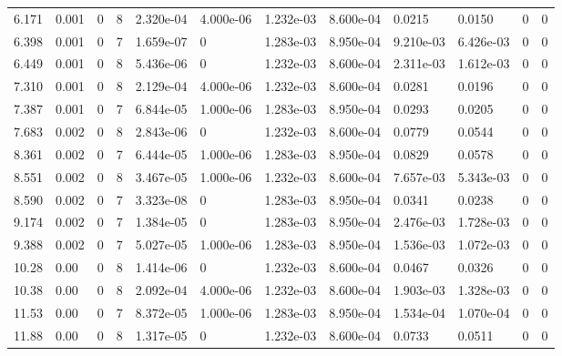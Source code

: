 \documentclass[preview]{standalone}
\begin{document}
{{\begin{tabular}{L{1.2cm}C{1.2cm} C{0.3cm}C{0.5cm} C{1.4cm}C{1.4cm} C{1.4cm}C{1.4cm} C{1.6cm}C{1.6cm} C{1.6cm}C{1.6cm}}
  6.171  &  0.001  & 0     &  8 &  2.320e-04  & 4.000e-06  &  1.232e-03&   8.600e-04& 0.0215 & 0.0150   &  0 & 0  \\ 
  6.398  &  0.001  & 0     &  7 &  1.659e-07  & 0  &  1.283e-03&   8.950e-04& 9.210e-03 & 6.426e-03   &  0 & 0  \\ 
  6.449  &  0.001  & 0     &  8 &  5.436e-06  & 0  &  1.232e-03&   8.600e-04& 2.311e-03 & 1.612e-03   &  0 & 0  \\ 
  7.310  &  0.001  & 0     &  8 &  2.129e-04  & 4.000e-06  &  1.232e-03&   8.600e-04& 0.0281 & 0.0196   &  0 & 0  \\ 
  7.387  &  0.001  & 0     &  7 &  6.844e-05  & 1.000e-06  &  1.283e-03&   8.950e-04& 0.0293 & 0.0205   &  0 & 0  \\ 
  7.683  &  0.002  & 0     &  8 &  2.843e-06  & 0  &  1.232e-03&   8.600e-04& 0.0779 & 0.0544   &  0 & 0  \\ 
  8.361  &  0.002  & 0     &  7 &  6.444e-05  & 1.000e-06  &  1.283e-03&   8.950e-04& 0.0829 & 0.0578   &  0 & 0  \\ 
  8.551  &  0.002  & 0     &  8 &  3.467e-05  & 1.000e-06  &  1.232e-03&   8.600e-04& 7.657e-03 & 5.343e-03   &  0 & 0  \\ 
  8.590  &  0.002  & 0     &  7 &  3.323e-08  & 0  &  1.283e-03&   8.950e-04& 0.0341 & 0.0238   &  0 & 0  \\ 
  9.174  &  0.002  & 0     &  7 &  1.384e-05  & 0  &  1.283e-03&   8.950e-04& 2.476e-03 & 1.728e-03   &  0 & 0  \\ 
  9.388  &  0.002  & 0     &  7 &  5.027e-05  & 1.000e-06  &  1.283e-03&   8.950e-04& 1.536e-03 & 1.072e-03   &  0 & 0  \\ 
  10.28  &  0.00  & 0     &  8 &  1.414e-06  & 0  &  1.232e-03&   8.600e-04& 0.0467 & 0.0326   &  0 & 0  \\ 
  10.38  &  0.00  & 0     &  8 &  2.092e-04  & 4.000e-06  &  1.232e-03&   8.600e-04& 1.903e-03 & 1.328e-03   &  0 & 0  \\ 
  11.53  &  0.00  & 0     &  7 &  8.372e-05  & 1.000e-06  &  1.283e-03&   8.950e-04& 1.534e-04 & 1.070e-04   &  0 & 0  \\ 
  11.88  &  0.00  & 0     &  8 &  1.317e-05  & 0  &  1.232e-03&   8.600e-04& 0.0733 & 0.0511   &  0 & 0  \\ 
\hline 
\end{tabular} 

}}
\end{document}

